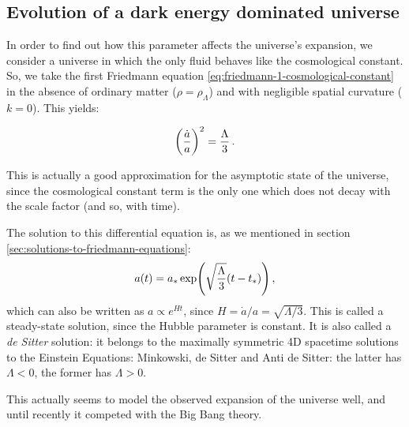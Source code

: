 \documentclass[main.tex]{subfiles}
\begin{document}

\subsection{Evolution of a dark energy dominated universe}

In order to find out how this parameter affects the universe's expansion, we consider a universe in which the only fluid behaves like the cosmological constant. 
So, we take the first Friedmann equation \eqref{eq:friedmann-1-cosmological-constant} in the absence of ordinary matter (\(\rho = \rho _\Lambda \)) and with negligible spatial curvature (\(k= 0\)). This yields:

\begin{equation}
  \qty(\frac{\dot{a} }{a})^2 = \frac{\Lambda}{3}
\,.
\end{equation}

This is actually a good approximation for the asymptotic state of the universe, since the cosmological constant term is the only one which does not decay with the scale factor (and so, with time).

The solution to this differential equation is, as we mentioned in section \ref{sec:solutions-to-friedmann-equations}:
%
\begin{equation}
  a(t) = a_{*} \exp(\sqrt{\frac{\Lambda}{3}} \qty(t-t_{*})) 
\,,
\end{equation}
%
which can also be written as \(a \propto e^{Ht}\), since \(H = \dot{a} / a = \sqrt{\Lambda / 3}\).
This is called a steady-state solution, since the Hubble parameter is constant. 
It is also called a \emph{de Sitter} solution: it belongs to the maximally symmetric 4D spacetime solutions to the Einstein Equations: Minkowski, de Sitter and Anti de Sitter: the latter has \(\Lambda < 0\), the former has \(\Lambda >0\).

This actually seems to model the observed expansion of the universe well, and until recently it competed with the Big Bang theory. 
\end{document}
